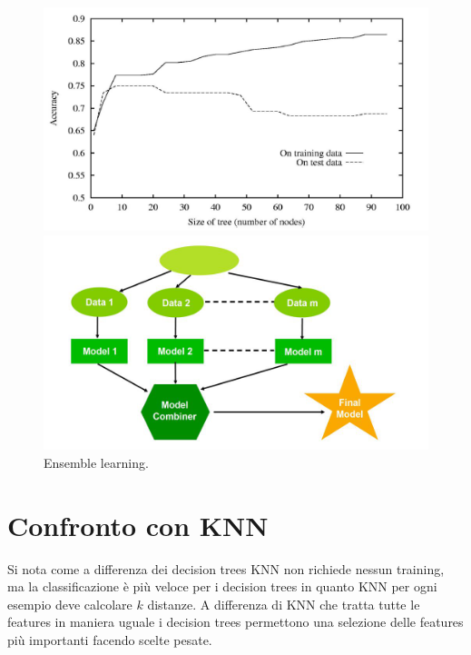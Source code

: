 \begin{figure}
	\centering
	\begin{minipage}{.5\textwidth}
		\centering
		\includegraphics[width=1\linewidth]{imgs/chapter5/img7}
		\caption{Decision trees e overfitting. Aumentare il numero di nodi sui dati di training sembrava una buona idea quando non lo era sui dati di test.}
		\label{fig:chapter05-07}
	\end{minipage}%
	\begin{minipage}{.5\textwidth}
		\centering
		\includegraphics[width=1\linewidth]{imgs/chapter5/img8}
		\caption{Ensemble learning.}
		\label{fig:chapter05-08}
	\end{minipage}
\end{figure}

\section{Confronto con KNN}
Si nota come a differenza dei decision trees KNN non richiede nessun training, ma la classificazione \`e pi\`u veloce per i decision trees in quanto KNN per ogni esempio deve calcolare $k$ distanze.
A differenza di KNN che tratta tutte le features in maniera uguale i decision trees permettono una selezione delle features pi\`u importanti facendo scelte pesate.
